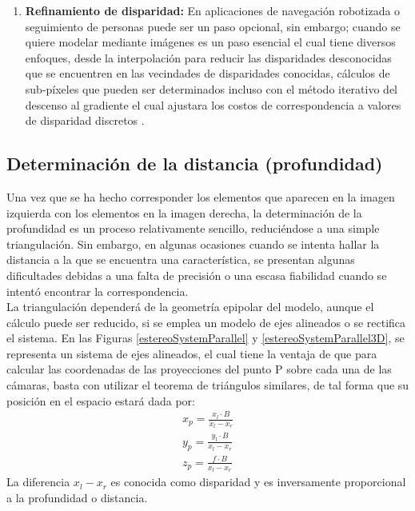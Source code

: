 \begin{enumerate}
    \item \textbf{Refinamiento de disparidad:} En aplicaciones de navegación robotizada o seguimiento de personas puede ser un paso opcional, sin embargo; cuando se quiere modelar mediante imágenes es un paso esencial el cual tiene diversos enfoques, desde la interpolación para reducir las disparidades desconocidas que se encuentren en las vecindades de disparidades conocidas, cálculos de sub-píxeles que pueden ser determinados incluso con el método iterativo del descenso al gradiente el cual ajustara los costos de correspondencia a valores de disparidad discretos \cite[p~6]{Scharstein2002}.
\end{enumerate}
\subsection{Determinación de la distancia (profundidad)}
Una vez que se ha hecho corresponder los elementos que aparecen en la imagen izquierda con los elementos en la imagen derecha, la determinación de la profundidad es un proceso relativamente sencillo, reduciéndose a una simple triangulación. Sin embargo, en algunas ocasiones cuando se intenta hallar la distancia a la que se encuentra una característica, se presentan algunas dificultades debidas a una falta de precisión o una escasa fiabilidad cuando se intentó encontrar la correspondencia.
\\
La triangulación dependerá de la geometría epipolar del modelo, aunque el cálculo puede ser reducido, si se emplea un modelo de ejes alineados o se rectifica el sistema.  En las Figuras \ref{estereoSystemParallel} y \ref{estereoSystemParallel3D}, se representa un sistema de ejes alineados, el cual tiene la ventaja de que para calcular las coordenadas de las proyecciones del punto P sobre cada una de las cámaras, basta con utilizar el teorema de triángulos similares, de tal forma que su posición en el espacio estará dada por: 
\begin{align}
x_{p} = \frac{x_{l}\cdot B}{x_{l} - x_{r}}\\
y_{p} = \frac{y_{l}\cdot B}{x_{l} - x_{r}}\\
z_{p} = \frac{f\cdot B}{x_{l} - x_{r}}
\end{align}
La diferencia $x_{l} - x_{r}$ es conocida como disparidad y es inversamente proporcional a la profundidad o distancia.
